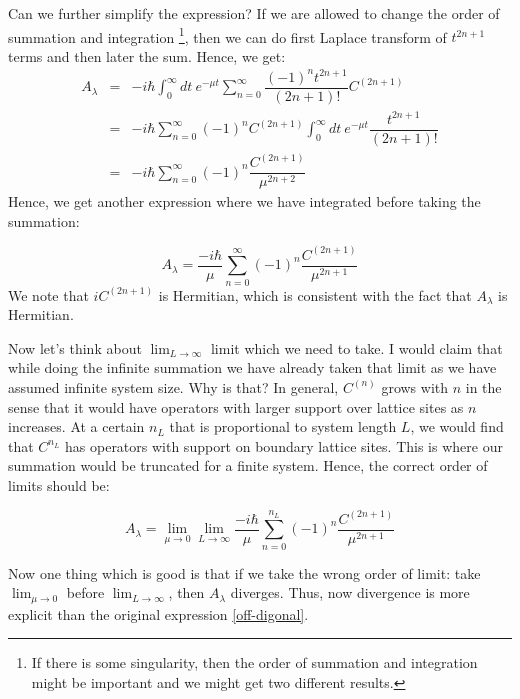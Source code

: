 \documentclass[11pt,a4paper]{article}
\begin{document}
Can we further simplify the expression? If we are allowed to change the order of summation and integration \footnote{If there is some singularity, then the order of summation and integration might be important and we might get two different results.}, then we can do first Laplace transform of $t ^{2n+1}$  terms and then later the sum.  Hence, we get:
\begin{eqnarray}
A_{\lambda} &=& - i\hbar \int_0^{\infty} dt\ e^{-\mu t} \sum_{n=0}^{\infty} \dfrac{(-1)^{n} t ^{2n+1}}{(2n+1)!} C^{(2n+1)} \\
 &=& - i\hbar  \sum_{n=0}^{\infty}(-1)^{n} C^{(2n+1)} \int_0^{\infty} dt\ e^{-\mu t}  \dfrac{ t ^{2n+1}}{(2n+1)!} \\
 &=& - i\hbar  \sum_{n=0}^{\infty}   (-1)^{n} \dfrac{ C^{(2n+1)}}{\mu^{2n+2}}
\end{eqnarray}
Hence, we get another expression where we have integrated before taking the summation:

\begin{equation}
\boxed{ A_{\lambda} =  \dfrac{-i\hbar}{\mu}  \sum_{n=0}^{\infty}   (-1)^{n} \dfrac{ C^{(2n+1)}}{\mu^{2n+1}}}
\label{def_2}
\end{equation}
We note that $i C^{(2n+1)}$ is Hermitian, which is consistent with the fact that $ A_{\lambda}$ is Hermitian. 


Now let's think about $\lim_{L \rightarrow \infty }$ limit which we need to take. I  would claim that while doing the infinite summation we have already taken that limit as we have assumed infinite system size. Why is that? In general,  $C^{(n)}$ grows with $n$ in the sense that it would have operators with larger support over lattice sites as $n$ increases. At a certain  $n_L$ that is proportional to system length $L$, we would find that $C^{n_L}$ has operators with support on boundary lattice sites. This is where our summation would be truncated for a finite system. Hence, the correct order of limits should be:

\begin{equation}
\boxed{ A_{\lambda} =   \lim_{\mu \rightarrow 0} \lim_{L \rightarrow \infty } \dfrac{-i\hbar}{\mu}  \sum_{n=0}^{n_L}   (-1)^{n} \dfrac{ C^{(2n+1)}}{\mu^{2n+1}}}
\end{equation}

Now one thing which is good is that if we take the wrong order of limit: take $\lim_{\mu \rightarrow 0}$ before $\lim_{L \rightarrow \infty }$, then $A_{\lambda}$ diverges. Thus, now divergence is more explicit than the original expression \ref{off-digonal}. 
\end{document}
